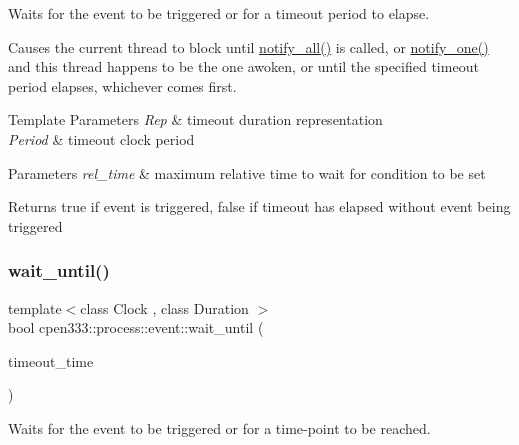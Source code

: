 Waits for the event to be triggered or for a timeout period to elapse. 

Causes the current thread to block until {\ttfamily \hyperlink{classcpen333_1_1process_1_1event_a80184c9e2762fb1a0d7f3a9ff6ae27e7}{notify\+\_\+all()}} is called, or {\ttfamily \hyperlink{classcpen333_1_1process_1_1event_a47077325cc6cb29df3aba00de683ce42}{notify\+\_\+one()}} and this thread happens to be the one awoken, or until the specified timeout period elapses, whichever comes first. 
\begin{DoxyTemplParams}{Template Parameters}
{\em Rep} & timeout duration representation \\
\hline
{\em Period} & timeout clock period \\
\hline
\end{DoxyTemplParams}

\begin{DoxyParams}{Parameters}
{\em rel\+\_\+time} & maximum relative time to wait for condition to be set \\
\hline
\end{DoxyParams}
\begin{DoxyReturn}{Returns}
{\ttfamily true} if event is triggered, {\ttfamily false} if timeout has elapsed without event being triggered 
\end{DoxyReturn}
\mbox{\label{classcpen333_1_1process_1_1event_ac64e2c2152ce879b199271f96e0a7335}} 
\subsubsection{\texorpdfstring{wait\+\_\+until()}{wait\_until()}}
{\footnotesize\ttfamily template$<$class Clock , class Duration $>$ \\
bool cpen333\+::process\+::event\+::wait\+\_\+until (\begin{DoxyParamCaption}\item[{const std\+::chrono\+::time\+\_\+point$<$ Clock, Duration $>$ \&}]{timeout\+\_\+time }\end{DoxyParamCaption})\hspace{0.3cm}{\ttfamily [inline]}}



Waits for the event to be triggered or for a time-\/point to be reached. 

